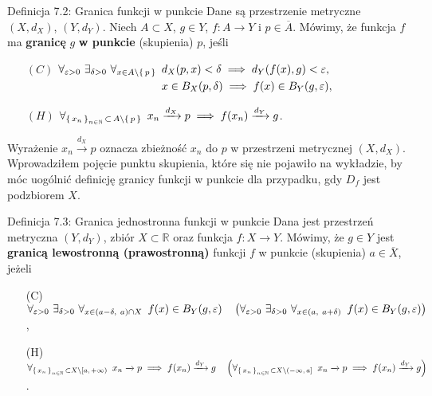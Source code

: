 \documentclass{article}
\newcommand{\hquad}{\mkern9mu}
\newcommand{\R}{\mathbb{R}}
\newcommand{\N}{\mathbb{N}}
\newcommand{\arr}[1]{\xrightarrow{#1}}
\newcommand*\closure[1]{\overline{#1}}
\newcommand{\seq}[1]{\set{#1_n}_{n\in\N}}
\begin{document}
\begin{defr}{Definicja 7.2: Granica funkcji w punkcie}
Dane są przestrzenie metryczne $(X,d_X)$, $(Y,d_Y)$. Niech $A\subset X$, $g\in Y$, $f:A\to Y$ i $p\in\closure{A}$.
Mówimy, że funkcja $f$ ma \textbf{granicę} $g$ \textbf{w punkcie} (skupienia) $p$, jeśli
\begin{enumerate}
    \item[$(C)$] $\begin{aligned}[t]
\forall_{\varepsilon>0}\ \exists_{\delta>0}\ \forall_{x\in A\setminus\set{p}}\hquad&d_X(p,x)<\delta\implies d_Y(f(x),g)<\varepsilon,\\
                &x\in B_X(p,\delta)\implies f(x)\in B_Y(g,\varepsilon),
\end{aligned}$
    \item[$(H)$] $\forall_{\seq{x}\,\subset\,A\setminus\set{p}}\hquad x_n\arr{d_X}p\implies f(x_n)\arr{d_Y}g$.
\end{enumerate}
\end{defr}

Wyrażenie $x_n\arr{d_X}p$ oznacza zbieżność $x_n$ do $p$ w przestrzeni metrycznej $(X,d_X)$. Wprowadziłem pojęcie punktu
skupienia, które się nie pojawiło na wykładzie, by móc uogólnić definicję granicy funkcji w punkcie dla przypadku, gdy $D_f$
jest podzbiorem $X$. 

\begin{defr}{Definicja 7.3: Granica jednostronna funkcji w punkcie}
Dana jest przestrzeń metryczna $(Y,d_Y)$, zbiór $X\subset\R$ oraz funkcja $f:X\to Y$.
Mówimy, że $g\in Y$ jest \textbf{granicą lewostronną
(prawostronną)} funkcji $f$ w punkcie (skupienia) $a\in\closure{X}$, jeżeli
\begin{enumerate}
    \item[(C)] $\forall_{\varepsilon>0}\ \exists_{\delta>0}\ \forall_{x\in(a-\delta,\ a)\cap X}\hquad f(x)\in B_Y(g, \varepsilon)\quad
    \left(\forall_{\varepsilon>0}\ \exists_{\delta>0}\ \forall_{x\in(a,\ a+\delta)}\hquad f(x)\in B_Y(g, \varepsilon)\right)$,
    \item[(H)] $\forall_{\seq{x}\,\subset X\setminus[a,\,+\infty)}\hquad x_n\arr{}p\implies f(x_n)\arr{d_Y}g\quad
    \left(\forall_{\seq{x}\,\subset X\setminus(-\infty,\,a]}\hquad x_n\arr{}p\implies f(x_n)\arr{d_Y}g\right)$.
\end{enumerate}
\end{defr}
\end{document}
